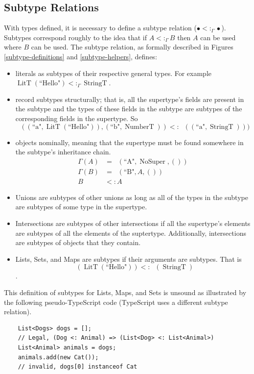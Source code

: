 \documentclass[12pt]{article}
\DeclareMathOperator{\StringT}{StringT}
\DeclareMathOperator{\NumberT}{NumberT}
\DeclareMathOperator{\LitT}{LitT}
\DeclareMathOperator{\RecT}{RecT_\Gamma}
\DeclareMathOperator{\ObjT}{ObjT_\Gamma}
\DeclareMathOperator{\ListT}{ListT_\Gamma}
\DeclareMathOperator{\NoSuper}{NoSuper}
\newcommand{\subtype}{<:_\Gamma}
\newcommand{\textq}[1]{\text{``#1"}}
\begin{document}
\subsection{Subtype Relations}

With types defined, it is necessary to define a subtype 
relation (\(\bullet\subtype\bullet\)). Subtypes correspond 
roughly to the idea that if \(A\subtype B\) then \(A\)
can be used where \(B\) can be used. The subtype relation,
as formally described in Figures \ref{subtype-definitions} and \ref{subtype-helpers}, 
defines: 
\begin{itemize}
    \item literals as subtypes of their respective general types.
For example \(\LitT(\text{``Hello"})\subtype\StringT\). 
    \item record subtypes structurally; that is, all the supertype's fields 
are present in the subtype and the types of these fields in the subtype
are subtypes of the corresponding fields in the supertype. 
    So \[\RecT((\text{``a"}, \LitT(\text{``Hello"})), (\text{``b"}, \NumberT))
    <: \RecT((\text{``a"}, \StringT)))\]
    \item objects nominally, meaning that the supertype must be
found somewhere in the subtype's inheritance chain.
    \begin{align*}
        \Gamma(A) &= \ObjT(\textq{A}, \NoSuper, ()) \\
        \Gamma(B) &= \ObjT(\textq{B}, A, ()) \\
        B &<: A
    \end{align*}
    \item Unions are subtypes of other unions as long as all of the types in the 
subtype are subtypes of some type in the supertype.
    \item Intersections are subtypes of other intersections if 
    all the supertype's elements are subtypes of all the elements of the suptertype.
    Additionally, intersections are subtypes of objects that they contain.
    \item Lists, Sets, and Maps are subtypes if their arguments are subtypes. 
    That is \[\ListT(\LitT(\textq{Hello})) <: \ListT(\StringT)\].
\end{itemize}

This definition of subtypes for Lists, Maps, and Sets is unsound
as illustrated by the following pseudo-TypeScript code 
(TypeScript uses a different subtype relation).

\begin{verbatim}
    List<Dogs> dogs = [];
    // Legal, (Dog <: Animal) => (List<Dog> <: List<Animal>)
    List<Animal> animals = dogs; 
    animals.add(new Cat()); 
    // invalid, dogs[0] instanceof Cat
\end{verbatim}
\end{document}

